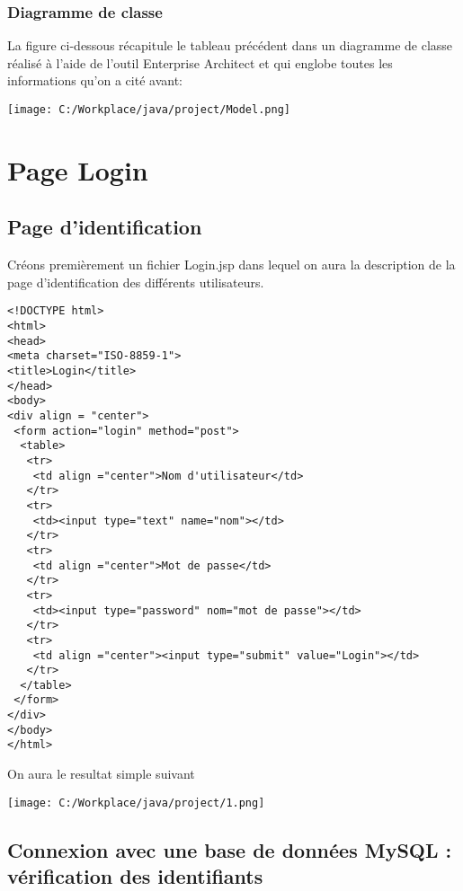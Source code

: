 \documentclass[12]{article}
\begin{document}
\subsubsection{Diagramme de classe}

La figure ci-dessous récapitule le tableau précédent dans un diagramme de classe réalisé à l'aide de l'outil Enterprise Architect et qui englobe toutes les informations qu'on a cité avant:
\begin{center}
\texttt{[image: C:/Workplace/java/project/Model.png]}
\end{center}


\newpage




\section{Page Login}
\subsection{Page d'identification}
\indent

Créons premièrement un fichier Login.jsp dans lequel on aura la description de la page d'identification des différents utilisateurs.

\lstset{language=XML}
\begin{scriptsize}
\begin{lstlisting}
<!DOCTYPE html>
<html>
<head>
<meta charset="ISO-8859-1">
<title>Login</title>
</head>
<body>
<div align = "center"> 
 <form action="login" method="post">
  <table>
   <tr>
    <td align ="center">Nom d'utilisateur</td>
   </tr>
   <tr>
    <td><input type="text" name="nom"></td>
   </tr>
   <tr>
    <td align ="center">Mot de passe</td>
   </tr>
   <tr>
    <td><input type="password" nom="mot de passe"></td>
   </tr>
   <tr>
    <td align ="center"><input type="submit" value="Login"></td>
   </tr>
  </table>
 </form>
</div>
</body>
</html>
\end{lstlisting}
\end{scriptsize}
On aura le resultat simple suivant\\

\begin{center}
\texttt{[image: C:/Workplace/java/project/1.png]}
\end{center}




\subsection{Connexion avec une base de données MySQL : vérification des identifiants}
\end{document}

